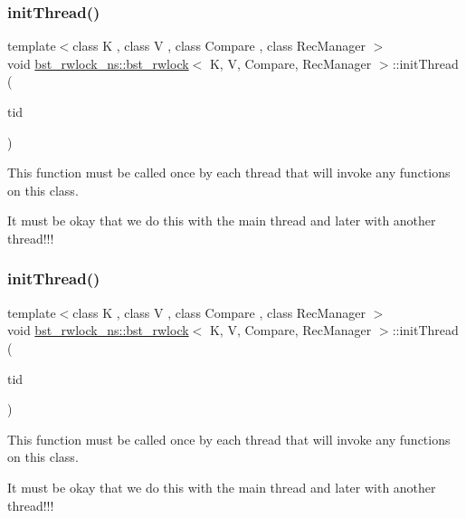 \subsubsection{\texorpdfstring{init\+Thread()}{initThread()}\hspace{0.1cm}{\footnotesize\ttfamily [1/2]}}
{\footnotesize\ttfamily template$<$class K , class V , class Compare , class Rec\+Manager $>$ \\
void \hyperlink{classbst__rwlock__ns_1_1bst__rwlock}{bst\+\_\+rwlock\+\_\+ns\+::bst\+\_\+rwlock}$<$ K, V, Compare, Rec\+Manager $>$\+::init\+Thread (\begin{DoxyParamCaption}\item[{const int}]{tid }\end{DoxyParamCaption})\hspace{0.3cm}{\ttfamily [inline]}}

This function must be called once by each thread that will invoke any functions on this class.

It must be okay that we do this with the main thread and later with another thread!!! \mbox{\label{classbst__rwlock__ns_1_1bst__rwlock_a786c88e4bafec7d09dc5f37a43d01aa1}} 
\subsubsection{\texorpdfstring{init\+Thread()}{initThread()}\hspace{0.1cm}{\footnotesize\ttfamily [2/2]}}
{\footnotesize\ttfamily template$<$class K , class V , class Compare , class Rec\+Manager $>$ \\
void \hyperlink{classbst__rwlock__ns_1_1bst__rwlock}{bst\+\_\+rwlock\+\_\+ns\+::bst\+\_\+rwlock}$<$ K, V, Compare, Rec\+Manager $>$\+::init\+Thread (\begin{DoxyParamCaption}\item[{const int}]{tid }\end{DoxyParamCaption})\hspace{0.3cm}{\ttfamily [inline]}}

This function must be called once by each thread that will invoke any functions on this class.

It must be okay that we do this with the main thread and later with another thread!!! \mbox{\label{classbst__rwlock__ns_1_1bst__rwlock_ae6c99b27e1a1d69029308fac2db945e3}} 
